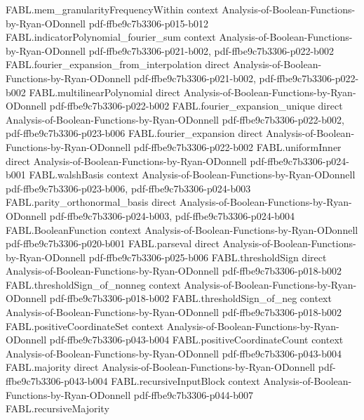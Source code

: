 \begin{theorem}
\proofstep
  {FABL.mem_granularityFrequencyWithin}
  {context}
  {Analysis-of-Boolean-Functions-by-Ryan-ODonnell}
  {pdf-ffbe9c7b3306-p015-b012}
\proofstep
  {FABL.indicatorPolynomial_fourier_sum}
  {context}
  {Analysis-of-Boolean-Functions-by-Ryan-ODonnell}
  {pdf-ffbe9c7b3306-p021-b002,
    pdf-ffbe9c7b3306-p022-b002}
\proofstep
  {FABL.fourier_expansion_from_interpolation}
  {direct}
  {Analysis-of-Boolean-Functions-by-Ryan-ODonnell}
  {pdf-ffbe9c7b3306-p021-b002,
    pdf-ffbe9c7b3306-p022-b002}
\proofstep
  {FABL.multilinearPolynomial}
  {direct}
  {Analysis-of-Boolean-Functions-by-Ryan-ODonnell}
  {pdf-ffbe9c7b3306-p022-b002}
\proofstep
  {FABL.fourier_expansion_unique}
  {direct}
  {Analysis-of-Boolean-Functions-by-Ryan-ODonnell}
  {pdf-ffbe9c7b3306-p022-b002,
    pdf-ffbe9c7b3306-p023-b006}
\proofstep
  {FABL.fourier_expansion}
  {direct}
  {Analysis-of-Boolean-Functions-by-Ryan-ODonnell}
  {pdf-ffbe9c7b3306-p022-b002}
\proofstep
  {FABL.uniformInner}
  {direct}
  {Analysis-of-Boolean-Functions-by-Ryan-ODonnell}
  {pdf-ffbe9c7b3306-p024-b001}
\proofstep
  {FABL.walshBasis}
  {context}
  {Analysis-of-Boolean-Functions-by-Ryan-ODonnell}
  {pdf-ffbe9c7b3306-p023-b006,
    pdf-ffbe9c7b3306-p024-b003}
\proofstep
  {FABL.parity_orthonormal_basis}
  {direct}
  {Analysis-of-Boolean-Functions-by-Ryan-ODonnell}
  {pdf-ffbe9c7b3306-p024-b003,
    pdf-ffbe9c7b3306-p024-b004}
\proofstep
  {FABL.BooleanFunction}
  {context}
  {Analysis-of-Boolean-Functions-by-Ryan-ODonnell}
  {pdf-ffbe9c7b3306-p020-b001}
\proofstep
  {FABL.parseval}
  {direct}
  {Analysis-of-Boolean-Functions-by-Ryan-ODonnell}
  {pdf-ffbe9c7b3306-p025-b006}
\proofstep
  {FABL.thresholdSign}
  {direct}
  {Analysis-of-Boolean-Functions-by-Ryan-ODonnell}
  {pdf-ffbe9c7b3306-p018-b002}
\proofstep
  {FABL.thresholdSign_of_nonneg}
  {context}
  {Analysis-of-Boolean-Functions-by-Ryan-ODonnell}
  {pdf-ffbe9c7b3306-p018-b002}
\proofstep
  {FABL.thresholdSign_of_neg}
  {context}
  {Analysis-of-Boolean-Functions-by-Ryan-ODonnell}
  {pdf-ffbe9c7b3306-p018-b002}
\proofstep
  {FABL.positiveCoordinateSet}
  {context}
  {Analysis-of-Boolean-Functions-by-Ryan-ODonnell}
  {pdf-ffbe9c7b3306-p043-b004}
\proofstep
  {FABL.positiveCoordinateCount}
  {context}
  {Analysis-of-Boolean-Functions-by-Ryan-ODonnell}
  {pdf-ffbe9c7b3306-p043-b004}
\proofstep
  {FABL.majority}
  {direct}
  {Analysis-of-Boolean-Functions-by-Ryan-ODonnell}
  {pdf-ffbe9c7b3306-p043-b004}
\proofstep
  {FABL.recursiveInputBlock}
  {context}
  {Analysis-of-Boolean-Functions-by-Ryan-ODonnell}
  {pdf-ffbe9c7b3306-p044-b007}
\proofstep
  {FABL.recursiveMajority}

\end{theorem}
